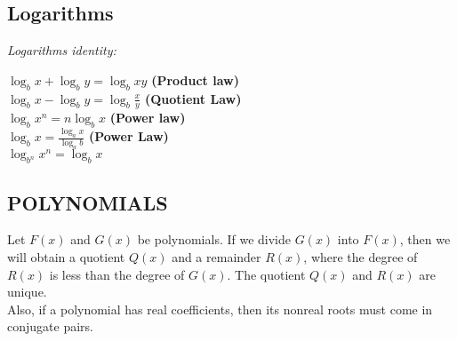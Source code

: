\documentclass[10pt]{article}
\theoremstyle{remark}
\begin{document}
\subsection{Logarithms}
\textit{Logarithms identity:}
\begin{center}
	$\log_{b}{x} + \log_{b}{y} = \log_{b}{xy}$ \textbf{(Product law)}\\
	$\log_{b}{x} - \log_{b}{y} = \log_{b}{\frac{x}{y}}$ \textbf{(Quotient Law)}\\
	$\log_{b}{x^n} = n\log_{b}{x}$ \textbf{(Power law)}\\
	$\log_b{x} = \frac{\log_a{x}}{\log_a{b}}$ \textbf{(Power Law)}\\
	$\log_{b^n}{x^n} = \log_{b}{x}$\\
\end{center}

\subsection{POLYNOMIALS}
Let $F(x)$ and $G(x)$ be polynomials. If we divide $G(x)$ into $F(x)$, then we will obtain a quotient $Q(x)$
and a remainder $R(x)$, where the degree of $R(x)$ is less than the degree of $G(x)$. The quotient $Q(x)$ and 
$R(x)$ are unique. \\

Also, if a polynomial has real coefficients, then its nonreal roots must come in conjugate pairs. 
\end{document}
